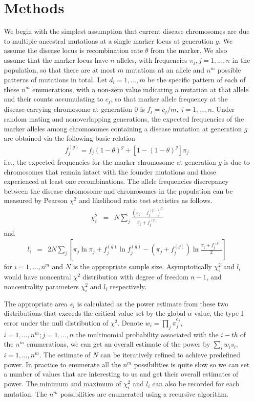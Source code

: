 \section{Methods}

We begin with the simplest assumption that current disease chromosomes are due
to multiple ancestral mutations at a single marker locus at generation $g$.  We
assume the disease locus is recombination rate $\theta$ from the marker.  We
also assume that the marker locus have $n$ alleles, with frequencies $\pi_j,
j=1, \ldots, n$ in the population, so that there are at most $m$ mutations at
an allele and $n^m$ possible patterns of mutations in total.  Let $d_i=1,
\dots, m$ be the specific pattern of each of these $n^m$ enumerations, with a
non-zero value indicating a mutation at that allele and their counts
accumulating to $c_j$, so that marker allele frequency at the disease-carrying
chromosome at generation 0 is $f_j=c_j/m$, $j=1, \ldots, n$.  Under random
mating and nonoverlapping generations, the expected frequencies of the marker
alleles among chromosomes containing a disease mutation at generation $g$ are
obtained via the following basic relation
\begin{eqnarray}
f_j^{(g)}=f_j(1-\theta)^g+\left[1-(1-\theta)^g\right]\pi_j\label{eqn1}
\end{eqnarray}
i.e., the expected frequencies for the marker chromosome at generation $g$
is due to chromosomes that remain intact with the founder mutations and those
experienced at least one recombinations.  The allele frequencies discrepancy
between the disease chromosome and chromosomes in the population can be
measured by Pearson $\chi^2$ and likelihood ratio test statistics as follows.
\begin{eqnarray}
\chi_i^2 &=& N\sum_j\frac{(\pi_j-f_j^{(g)})^2}{\pi_j+f_j^{(g)}}\label{eqn2}
\end{eqnarray}
and
\begin{eqnarray}
l_i &=& 2N \sum_j\left[\pi_j\ln \pi_j+f_j^{(g)}\ln
f_j^{(g)}-(\pi_j+f_j^{(g)})\ln\frac{\pi_j+f_j^{(g)}}{2}\right]\label{eqn3}
\end{eqnarray}
for $i=1, \ldots, n^m$ and $N$ is the appropriate sample size. Asymptotically
$\chi_i^2$ and $l_i$ would have noncentral $\chi^2$ distribution with degree
of freedom $n-1$, and noncentrality parameters $\chi_i^2$ and $l_i$
respectively.

The appropriate area $s_i$ is calculated as the power estimate from these
two distributions that exceeds the critical value set by the global
$\alpha$ value, the type I error under the null distribution of $\chi^2$.
Denote $w_i=\prod_j \pi_j^{c_j}$,$i=1,\ldots,n^m; j=1, \dots, n$ the
multinomial probability associated with the $i-th$ of the $n^m$
enumerations, we can get an overall estimate of the power by $\sum_i
w_is_i$, $i=1,\ldots,n^m$. The estimate of $N$ can be iteratively refined
to achieve predefined power. In practice to enumerate all the $n^m$
possibilities is quite slow so we can set a number of values that are
interesting to us and get their overall estimates of power. The minimum
and maximum of $\chi_i^2$ and $l_i$ can also be recorded for each
mutation. The $n^m$ possibilities are enumerated using a recursive algorithm.


